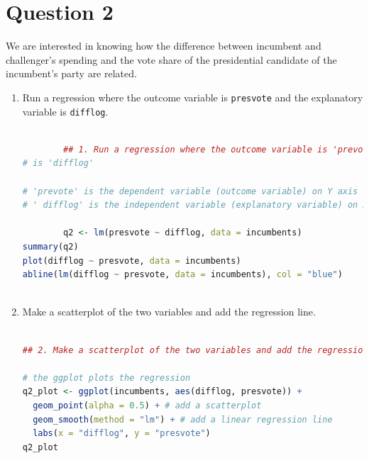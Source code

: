 \documentclass[12pt,letterpaper]{article}
\begin{document}
\section*{Question 2}%
\noindent We are interested in knowing how the difference between incumbent and challenger's spending and the vote share of the presidential candidate of the incumbent's party are related.	\vspace{.25cm}
	\begin{enumerate}
		\item Run a regression where the outcome variable is \texttt{presvote} and the explanatory variable is \texttt{difflog}.	\vspace{5cm}
		
		\begin{lstlisting}[language=R]
		
		## 1. Run a regression where the outcome variable is 'prevote' and the explanatory variable
# is 'difflog' 

# 'prevote' is the dependent variable (outcome variable) on Y axis
# ' difflog' is the independent variable (explanatory variable) on X axis
		
		q2 <- lm(presvote ~ difflog, data = incumbents)
summary(q2)
plot(difflog ~ presvote, data = incumbents)
abline(lm(difflog ~ presvote, data = incumbents), col = "blue")
		
		\end{lstlisting}
		
		
		\item Make a scatterplot of the two variables and add the regression line. 	\vspace{5cm}
		
		\begin{lstlisting}[language=R]
		
## 2. Make a scatterplot of the two variables and add the regression line

# the ggplot plots the regression
q2_plot <- ggplot(incumbents, aes(difflog, presvote)) +
  geom_point(alpha = 0.5) + # add a scatterplot
  geom_smooth(method = "lm") + # add a linear regression line
  labs(x = "difflog", y = "presvote")
q2_plot
		
		\end{lstlisting}
		

\end{enumerate}
\end{document}
